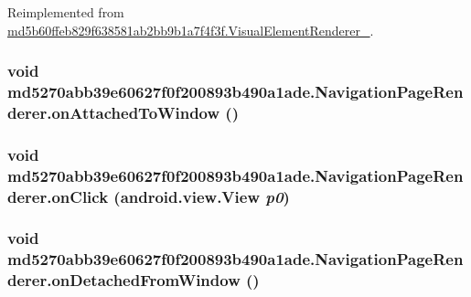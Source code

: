 Reimplemented from \hyperlink{classmd5b60ffeb829f638581ab2bb9b1a7f4f3f_1_1_visual_element_renderer__1_93658aeaafe1fbcb5301e4b9cbf9f833}{md5b60ffeb829f638581ab2bb9b1a7f4f3f.VisualElementRenderer\_}.\hypertarget{classmd5270abb39e60627f0f200893b490a1ade_1_1_navigation_page_renderer_12cd8c12878acf8cb8fb5d4f96c24323}{
\subsubsection[{onAttachedToWindow}]{\setlength{\rightskip}{0pt plus 5cm}void md5270abb39e60627f0f200893b490a1ade.NavigationPageRenderer.onAttachedToWindow ()}}
\label{classmd5270abb39e60627f0f200893b490a1ade_1_1_navigation_page_renderer_12cd8c12878acf8cb8fb5d4f96c24323}


\hypertarget{classmd5270abb39e60627f0f200893b490a1ade_1_1_navigation_page_renderer_7e527b733de3bf06dd5a960f472265d5}{
\subsubsection[{onClick}]{\setlength{\rightskip}{0pt plus 5cm}void md5270abb39e60627f0f200893b490a1ade.NavigationPageRenderer.onClick (android.view.View {\em p0})}}
\label{classmd5270abb39e60627f0f200893b490a1ade_1_1_navigation_page_renderer_7e527b733de3bf06dd5a960f472265d5}


\hypertarget{classmd5270abb39e60627f0f200893b490a1ade_1_1_navigation_page_renderer_4d03da66e9434ab5b96541f9a8a34830}{
\subsubsection[{onDetachedFromWindow}]{\setlength{\rightskip}{0pt plus 5cm}void md5270abb39e60627f0f200893b490a1ade.NavigationPageRenderer.onDetachedFromWindow ()}}
\label{classmd5270abb39e60627f0f200893b490a1ade_1_1_navigation_page_renderer_4d03da66e9434ab5b96541f9a8a34830}


